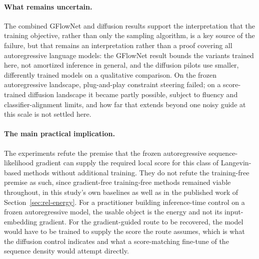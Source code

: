 \paragraph*{What remains uncertain.} The combined GFlowNet and diffusion results support the interpretation that the training objective, rather than only the sampling algorithm, is a key source of the failure, but that remains an interpretation rather than a proof covering all autoregressive language models: the GFlowNet result bounds the variants trained here, not amortized inference in general, and the diffusion pilots use smaller, differently trained models on a qualitative comparison. On the frozen autoregressive landscape, plug-and-play constraint steering failed; on a score-trained diffusion landscape it became partly possible, subject to fluency and classifier-alignment limits, and how far that extends beyond one noisy guide at this scale is not settled here.

\paragraph*{The main practical implication.} The experiments refute the premise that the frozen autoregressive sequence-likelihood gradient can supply the required local score for this class of Langevin-based methods without additional training. They do not refute the training-free premise as such, since gradient-free training-free methods remained viable throughout, in this study's own baselines as well as in the published work of Section~\ref{sec:rel-energy}. For a practitioner building inference-time control on a frozen autoregressive model, the usable object is the energy and not its input-embedding gradient. For the gradient-guided route to be recovered, the model would have to be trained to supply the score the route assumes, which is what the diffusion control indicates and what a score-matching fine-tune of the sequence density would attempt directly.

